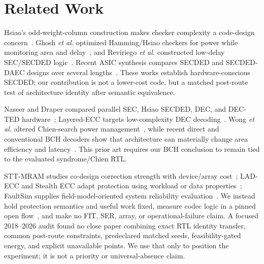 \section{Related Work}

Hsiao's odd-weight-column construction makes checker complexity a code-design concern~\cite{hsiao1970}. Ghosh \emph{et al.} optimized Hamming/Hsiao checkers for power while monitoring area and delay~\cite{ghosh2004}, and Reviriego \emph{et al.} constructed low-delay SEC/SECDED logic~\cite{reviriego2013}. Recent ASIC synthesis compares SECDED and SECDED-DAEC designs over several lengths~\cite{tripathi2020}. These works establish hardware-conscious SECDED; our contribution is not a lower-cost code, but a matched post-route test of architecture identity after semantic equivalence.

Naseer and Draper compared parallel SEC, Hsiao SECDED, DEC, and DEC-TED hardware~\cite{naseer2008}; Layered-ECC targets low-complexity DEC decoding~\cite{das2019}. Wong \emph{et al.} altered Chien-search power management~\cite{wong2011}, while recent direct and conventional BCH decoders show that architecture can materially change area efficiency and latency~\cite{lagendijk2026}. This prior art requires our BCH conclusion to remain tied to the evaluated syndrome/Chien RTL.

STT-MRAM studies co-design correction strength with device/array cost~\cite{delbel2014,pajouhi2015}; LAD-ECC and Stealth ECC adapt protection using workload or data properties~\cite{wei2020,lee2022}; FaultSim supplies field-model-oriented system reliability evaluation~\cite{nair2016}. We instead hold protection semantics and useful work fixed, measure codec logic in a pinned open flow~\cite{ajayi2019}, and make no FIT, SER, array, or operational-failure claim. A focused 2018--2026 audit found no close paper combining exact RTL identity transfer, common post-route constraints, predeclared matched seeds, feasibility-gated energy, and explicit unavailable points. We use that only to position the experiment; it is not a priority or universal-absence claim.

